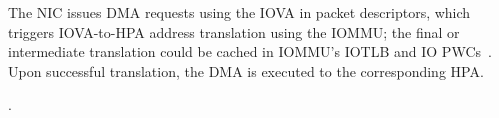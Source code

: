 

The NIC issues DMA requests using the IOVA in packet descriptors,
    which triggers IOVA-to-HPA address translation using the IOMMU; 
the final or intermediate translation 
    could be cached in IOMMU's IOTLB and IO PWCs~\cite{Rubin2024FastSafe}. Upon successful translation, the DMA is executed to the corresponding HPA. 


. 
\fi

